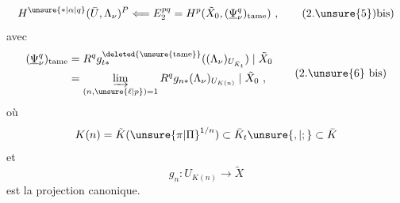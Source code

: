 
\[
H^{\unsure{*|\alpha|q}}(\bar U,\Lambda_\nu)^P\Longleftarrow E_2^{pq}=H^p(\tilde X_0,(\underline\Psi_\nu^q)_{\mathrm{tame}})\ ,
\tag*{(2.\unsure{5})bis)}
\]
avec
\[
\begin{aligned}
(\underline\Psi_\nu^q)_{\mathrm{tame}}&=R^qg_{t*}^{\deleted{\unsure{\mathrm{tame}}}}((\Lambda_\nu)_{U_{\bar K_t}})\mid\tilde X_0\\
&=\varinjlim_{(n,\unsure{\ell|p})=1}R^qg_{n*}(\Lambda_\nu)_{U_{K(n)}}\mid\tilde X_0\ ,
\end{aligned}
\tag*{(2.\unsure{6} bis)}
\]
où
\[
K(n)=\tilde K({\unsure{\pi|\Pi}}^{1/n})\subset\bar K_t\unsure{,|;}\subset\bar K
\]
et
\[
g_n:U_{K(n)}\longrightarrow\tilde X
\]
est la projection canonique.
